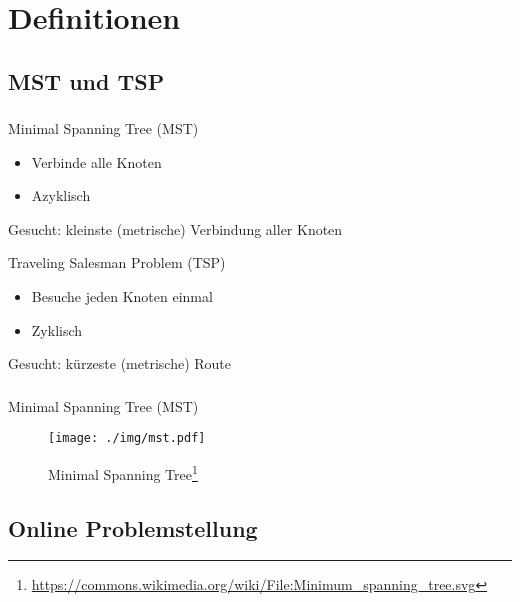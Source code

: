 \section{Definitionen}
\subsection{MST und TSP}

\begin{frame}
    \frametitle{\insertsubsection}
    \begin{block}{Minimal Spanning Tree (MST)}
        \vspace{1em}
        \begin{itemize}
            \itemsep\setlength{.8em}
            \item Verbinde alle Knoten
            \item Azyklisch
        \end{itemize}
        Gesucht: kleinste (metrische) Verbindung aller Knoten
    \end{block}
    \vspace{1em}
    \begin{block}{Traveling Salesman Problem (TSP)}
        \vspace{1em}
        \begin{itemize}
            \itemsep\setlength{.8em}
            \item Besuche jeden Knoten einmal
            \item Zyklisch
        \end{itemize}
        Gesucht: kürzeste (metrische) Route
    \end{block}
\end{frame}

\begin{frame}
    \frametitle{\insertsubsection}
    Minimal Spanning Tree (MST)
    \begin{figure}
        \centering
        \texttt{[image: ./img/mst.pdf]}
        \caption{Minimal Spanning Tree\footnote{\url{https://commons.wikimedia.org/wiki/File:Minimum_spanning_tree.svg}}}
    \end{figure}
\end{frame}

\subsection{Online Problemstellung}

